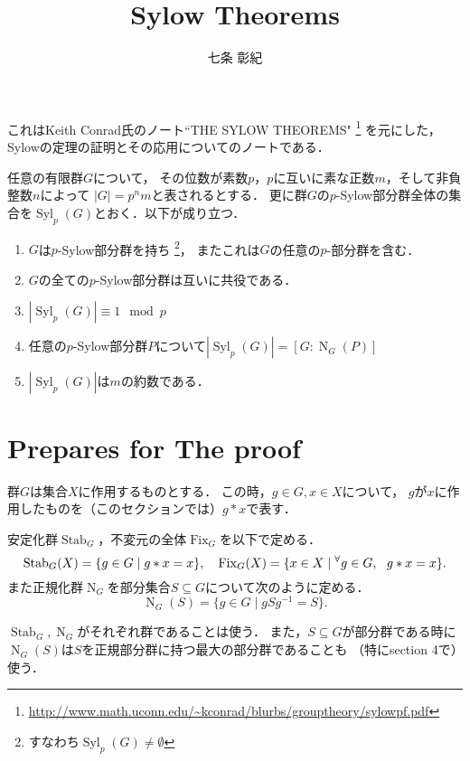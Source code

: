 \documentclass[a4paper]{jsarticle}
\title{Sylow Theorems}
\author{七条 彰紀}
\newcommand{\Stab}{\operatorname{Stab}}
\newcommand{\Fix}{\operatorname{Fix}}
\newcommand{\Norm}{\operatorname{N}}
\newcommand{\Syl}{\operatorname{Syl}}
\begin{document}
\maketitle
これはKeith Conrad氏のノート``THE SYLOW THEOREMS"
\footnote{\url{http://www.math.uconn.edu/~kconrad/blurbs/grouptheory/sylowpf.pdf}}
を元にした，Sylowの定理の証明とその応用についてのノートである．

\begin{Thm*}
    任意の有限群$G$について，
    その位数が素数$p$，$p$に互いに素な正数$m$，そして非負整数$n$によって
    $|G|=p^{n}m$と表されるとする．
    更に群$G$の$p$-Sylow部分群全体の集合を$\Syl_p(G)$とおく．以下が成り立つ．
    \begin{enumerate}[label=\Roman*.]
        \item
            $G$は$p$-Sylow部分群を持ち
            \footnote{すなわち$\Syl_p(G) \neq \emptyset$}，
            またこれは$G$の任意の$p$-部分群を含む．
        \item $G$の全ての$p$-Sylow部分群は互いに共役である．
        \item $|\Syl_p(G)| \equiv 1 \mod p$
        \item 任意の$p$-Sylow部分群$P$について$|\Syl_p(G)| = [G:\Norm_G(P)]$
        \item $|\Syl_p(G)|$は$m$の約数である．
    \end{enumerate}
\end{Thm*}

\section{Prepares for The proof}
    群$G$は集合$X$に作用するものとする．
    この時，$g \in G, x \in X$について，
    $g$が$x$に作用したものを（このセクションでは）$g \ast x$で表す．
    \begin{Def}
        安定化群$\Stab_G$，不変元の全体$\Fix_G$を以下で定める．
        \[
            \Stab_G(X)=\{ g \in G \mid g \ast x=x \},~~~
            \Fix_G(X)=\{x \in X \mid \Forall{g \in G} g \ast x=x \}.
        \]
        また正規化群$\Norm_G$を部分集合$S \subseteq G$について次のように定める．
        \[ \Norm_G(S)=\{ g \in G \mid gSg^{-1}=S \}. \]
    \end{Def}
    $\Stab_G, \Norm_G$がそれぞれ群であることは使う．
    また，$S \subseteq G$が部分群である時に
    $\Norm_G(S)$は$S$を正規部分群に持つ最大の部分群であることも
    （特にsection 4で）使う．
\end{document}
